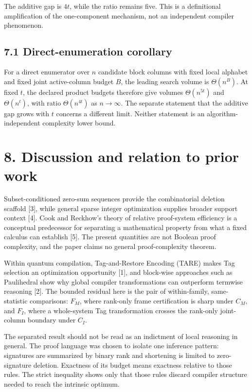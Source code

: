 \documentclass[11pt]{article}
\begin{document}
The additive gap is \(4t\), while the ratio remains five. This is a definitional amplification of the one-component mechanism, not an independent compiler phenomenon.

\hypertarget{direct-enumeration-corollary}{%
\subsection*{7.1 Direct-enumeration corollary}\label{direct-enumeration-corollary}}

For a direct enumerator over \(n\) candidate block columns with fixed local alphabet and fixed joint active-column budget \(B\), the leading search volume is \(\Theta(n^B)\). At fixed \(t\), the declared product budgets therefore give volumes \(\Theta(n^{5t})\) and \(\Theta(n^t)\), with ratio \(\Theta(n^{4t})\) as \(n\to\infty\). The separate statement that the additive gap grows with \(t\) concerns a different limit. Neither statement is an algorithm-independent complexity lower bound.

\hypertarget{discussion-and-relation-to-prior-work}{%
\section*{8. Discussion and relation to prior work}\label{discussion-and-relation-to-prior-work}}

Subset-conditioned zero-sum sequences provide the combinatorial deletion scaffold {[}3{]}, while general sparse integer optimization supplies broader support context {[}4{]}. Cook and Reckhow's theory of relative proof-system efficiency is a conceptual predecessor for separating a mathematical property from what a fixed calculus can establish {[}5{]}. The present quantities are not Boolean proof complexity, and the paper claims no general proof-complexity theorem.

Within quantum compilation, Tag-and-Restore Encoding (TARE) makes Tag selection an optimization opportunity {[}1{]}, and block-wise approaches such as Paulihedral show why global compiler transformations can outperform termwise reasoning {[}2{]}. The bounded residual here is the pair of within-family, same-statistic comparisons: \(F_M\), where rank-only frame certification is sharp under \(C_M\), and \(F_I\), where a whole-system Tag transformation crosses the rank-only joint-column boundary under \(C_I\).

The separated result should not be read as an indictment of local reasoning in general. The proof language was chosen to isolate one inference pattern: signatures are summarized by binary rank and shortening is limited to zero-signature deletion. Exactness of its budget means exactness relative to those rules. The strict inequality shows only that those rules discard compiler structure needed to reach the intrinsic optimum.
\end{document}

